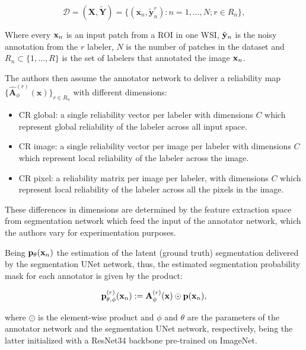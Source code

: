 \begin{equation}
  \label{eq:input_data}
  \mathcal{D} = (\mathbf{X}, \tilde{\mathbf{Y}}) = \{ (\mathbf{x}_n,
  \tilde{\mathbf{y}}_n^r) : n = 1, \dots, N; r \in R_n \},
\end{equation}

Where every $\mathbf{x}_n$ is an input patch from a ROI in one \gls{WSI},
$\tilde{\mathbf{y}}_n$ is the noisy annotation from the $r$ labeler, $N$
is the number of patches in the dataset and $R_n \subset \{1, \dots,
R\}$ is the set of labelers that annotated the image $\mathbf{x}_n$.

The authors then assume the annotator network to deliver a
reliability map $\{\hat{\mathbf{A}}^{(r)}_{\phi}(\mathbf{x}) \}_{r
\in R_n}$ with different dimensions:

\begin{itemize}
  \item CR global: a single reliability vector per labeler with
    dimensions $C$ which represent global reliability of the labeler
    across all input space.
  \item CR image: a single reliability vector per image per labeler
    with dimensions $C$ which represent local reliability of the labeler
    across the image.
  \item CR pixel: a reliability matrix per image per labeler,
    with dimensions $C$ which represent local reliability of the labeler
    across all the pixels in the image.
\end{itemize}

These differences in dimensions are determined by the feature
extraction space from segmentation network which feed the input of the
annotator network, which the authors vary for experimentation purposes.

Being $\mathbf{p}_\theta(\mathbf{x}_n)$ the estimation of the latent (ground
truth) segmentation delivered by the segmentation UNet network, thus,
the estimated segmentation probability mask for each annotator is
given by the product:

\begin{equation}
  \label{eq:estimated_segmentation}
  \mathbf{p}^{(r)}_{\theta,\phi}(\mathbf{x}_n) :=
  \mathbf{A}^{(r)}_{\phi}(\mathbf{x}) \odot \mathbf{p}(\mathbf{x}_n),
\end{equation}

where $\odot$ is the element-wise product and $\phi$ and $\theta$ are
the parameters of the annotator network and the segmentation UNet
network, respectively, being the latter initialized with a ResNet34 backbone
pre-trained on ImageNet.

